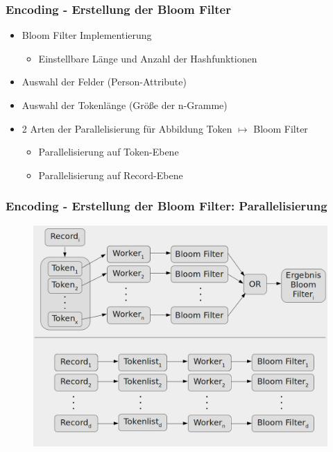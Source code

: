 \documentclass{beamer}
\begin{document}
    \begin{frame}
    		\frametitle{Encoding - Erstellung der Bloom Filter}
    		\begin{itemize}
    			\item Bloom Filter Implementierung
    			\begin{itemize}
    				\item Einstellbare Länge und Anzahl der Hashfunktionen
    			\end{itemize}
    			\item Auswahl der Felder (Person-Attribute)
    			\item Auswahl der Tokenlänge (Größe der n-Gramme)
    			\item 2 Arten der Parallelisierung für Abbildung Token $\mapsto$ Bloom Filter
    			\begin{itemize}
    				\item Parallelisierung auf Token-Ebene
    				\item Parallelisierung auf Record-Ebene
    			\end{itemize}
    		\end{itemize}
    \end{frame}
    
    \begin{frame}
    		\frametitle{Encoding - Erstellung der Bloom Filter: Parallelisierung}
    		\begin{figure}[H]
    				\includegraphics[width=\textwidth]{graphics/bf_par.png}
    		\end{figure}
    \end{frame}
   
\end{document}
